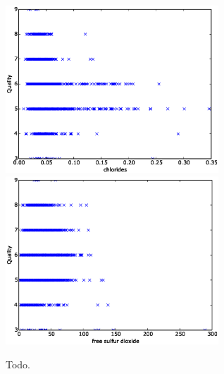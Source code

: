 \documentclass[11pt]{article}
\begin{document}
\begin{figure}[h]
  \includegraphics[width=8cm]{chlorides.eps}
  \includegraphics[width=8cm]{free_sulfur_dioxide.eps}
  \caption{Todo.}
  \label{fig:todo}
\end{figure}
\end{document}
